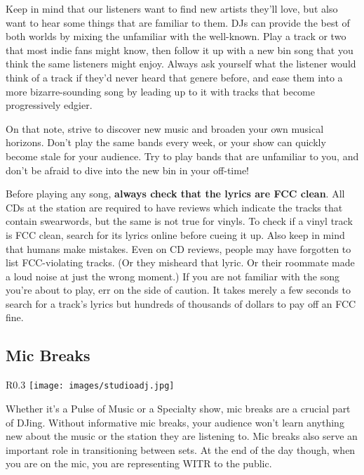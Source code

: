\documentclass{witrman}
\begin{document}
Keep in mind that our listeners want to find new artists they'll love, but
also want to hear some things that are familiar to them.  DJs can provide the
best of both worlds by mixing the unfamiliar with the well-known.  Play a track
or two that most indie fans might know, then follow it up with a new bin song
that you think the same listeners might enjoy.  Always ask yourself what the
listener would think of a track if they'd never heard that genere before, and
ease them into a more bizarre-sounding song by leading up to it with tracks that
become progressively edgier.

On that note, strive to discover new music and broaden your own musical
horizons.  Don't play the same bands every week, or your show can quickly become
stale for your audience.  Try to play bands that are unfamiliar to you, and don't
be afraid to dive into the new bin in your off-time!

Before playing any song, \textbf{always check that the lyrics are FCC clean}.
All CDs at the station are required to have reviews which indicate the tracks
that contain swearwords, but the same is not true for vinyls.  To check if a
vinyl track is FCC clean, search for its lyrics online before cueing it up.
Also keep in mind that humans make mistakes.  Even on CD reviews, people may
have forgotten to list FCC-violating tracks.  (Or they misheard that lyric.  Or
their roommate made a loud noise at just the wrong moment.)  If you are not
familiar with the song you're about to play, err on the side of caution.  It
takes merely a few seconds to search for a track's lyrics but hundreds of
thousands of dollars to pay off an FCC fine.

\subsection{Mic Breaks}

\begin{wrapfigure}{R}{0.3\linewidth}
    \centering
    \texttt{[image: images/studioadj.jpg]}
\end{wrapfigure}

Whether it's a Pulse of Music or a Specialty show, mic breaks are a crucial part
of DJing.  Without informative mic breaks, your audience won't learn anything
new about the music or the station they are listening to.  Mic breaks also serve
an important role in transitioning between sets.  At the end of the day though,
when you are on the mic, you are representing WITR to the public.
\end{document}
